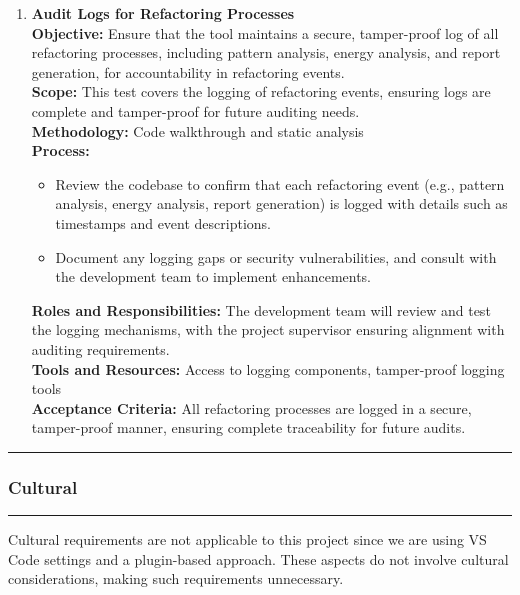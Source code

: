 \documentclass[12pt, titlepage]{article}
\newcommand{\colorrule}{\textcolor{BlueViolet}{\rule{\linewidth}{2pt}}}
\begin{document}
  \begin{enumerate}[label={\bf
      \textcolor{Maroon}{test-SRT-\arabic*}}, wide=0pt, font=\itshape]
    \item \textbf{Audit Logs for Refactoring Processes} \\[2mm]
      \textbf{Objective:} Ensure that the tool maintains a secure,
      tamper-proof log of all refactoring processes, including
      pattern analysis, energy analysis, and report generation, for
      accountability in refactoring events. \\[2mm]
      \textbf{Scope:} This test covers the logging of refactoring
      events, ensuring logs are complete and tamper-proof for future
      auditing needs. \\[2mm]
      \textbf{Methodology:} Code walkthrough and static analysis \\[2mm]
      \textbf{Process:}
      \begin{itemize}
        \item Review the codebase to confirm that each refactoring
          event (e.g., pattern analysis, energy analysis, report
          generation) is logged with details such as timestamps and
          event descriptions.
        \item Document any logging gaps or security vulnerabilities,
          and consult with the development team to implement enhancements.
      \end{itemize}
      \textbf{Roles and Responsibilities:} The development team will
      review and test the logging mechanisms, with the project
      supervisor ensuring alignment with auditing requirements. \\[2mm]
      \textbf{Tools and Resources:} Access to logging components,
      tamper-proof logging tools \\[2mm]
      \textbf{Acceptance Criteria:} All refactoring processes are
      logged in a secure, tamper-proof manner, ensuring complete
      traceability for future audits.
  \end{enumerate}

  \noindent
  \colorrule

  \subsubsection{Cultural}
  \colorrule

  \medskip

  \noindent
  Cultural requirements are not applicable to this project since we
  are using VS Code settings and a plugin-based approach. These
  aspects do not involve cultural considerations, making such
  requirements unnecessary.
\end{document}
